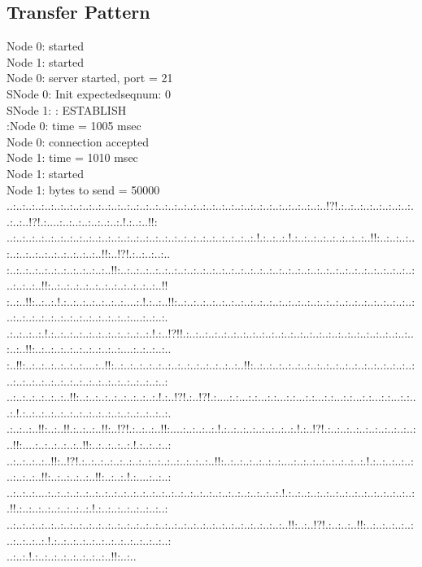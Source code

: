 \documentclass[paper=a4, fontsize=11pt]{scrartcl} %
\numberwithin{equation}{section} %
\numberwithin{figure}{section} %
\numberwithin{table}{section} %
\begin{document}
\subsection{Transfer Pattern}
Node 0: started\\
Node 1: started\\
Node 0: server started, port = 21\\
SNode 0: Init expectedseqnum: 0\\
SNode 1: : ESTABLISH\\
:Node 0: time = 1005 msec\\
Node 0: connection accepted\\
Node 1: time = 1010 msec\\
Node 1: started\\
Node 1: bytes to send = 50000\\
..:..:..:..:..:..:..:..:..:..:..:..:..:..:..:..:..:..:..:..:..:..:..:..:..:..:..:..:..:..:..:..:..:..!?!.:..:..:..:..:..:..:..:..:..:..!?!.:....:..:..:..:..:..:..:.!.:..:..!!:\\..:..:..:..:..:..:..:..:..:..:..:..:..:..:..:..:..:..:..:..:..:..:..:..:..:..:.!.:..:..:.!.:..:..:..:..:..:..:..:..!!:..:..:..:..:..:..:..:..:..:..:..:..:..:..!!:..!?!.:..:..:..:..\\:..:..:..:..:..:..:..:..:..:..:..!!:..:..:..:..:..:..:..:..:..:..:..:..:..:..:..:..:..:..:..:..:..:..:..:..:..:..:..:..:..:..:..:..:..:..:..!!:..:..:..:..:..:..:..:..:..:..:..:..!!\\:..:..!!:..:..:.!.:..:..:..:..:..:..:....:.!.:..:..!!:..:..:..:..:..:..:..:..:..:..:..:..:..:..:..:..:..:..:..:..:..:..:..:..:..:..:..:..:..:..:..:..:..:..:..:..:..:..:....:..:..:.\\.:..:..:..:.!.:..:..:..:..:..:..:..:..:..:..:.!.:..!?!!.:..:..:..:..:..:..:..:..:..:..:..:..:..:..:..:..:..:..:..:..:..:..:..:..:..:..!!:..:..:..:..:..:..:..:..:..:....:..:..:..:..\\:..!!:..:..:..:..:..:..:....:..!!:..:..:..:..:..:..:..:..:..:..:..:..:..:..!!:..:..:..:..:..:..:..:..:..:..:..:..:..:..:..:..:..:..:..:..:..:..:..:..:..:..:..:..:..:..:..:..:..:..:\\..:..:..:..:..:..:..!!:..:..:..:..:..:..:..:..:.!.:..!?!.:..!?!.:....:.:...:.:...:.:...:.:...:.:...:.:...:.:...:.:...:.:...:.:...:.!.:..:..:..:..:..:..:..:..:..:..:..:..:..:..:..:.\\.:..:..:..!!:..:..!!.:..:..:..!!:..!?!.:..:..:..!!:....:..:..:..:.!.:..:..:..:..:..:..:..:.!.:..!?!.:..:..:..:..:..:..:..:..:..:..!!:....:..:..:..:..:..!!:..:..:..:..:.!.:..:..:..:\\..:..:..:..:..!!:..!?!.:..:..:..:..:..:..:..:..:..:..:..:..:..:..!!:..:..:..:..:..:..:....:..:..:..:..:..:..:..:.!.:..:..:..:..:..:..:..:..!!:..:..:..:..:..!!:..:..:.!.:....:..:..:\\..:..:..:....:..:..:..:..:..:..:..:..:..:..:..:..:..:..:..:..:..:..:..:..:..:..:..:..:.!.:..:..:..:..:..:..:..:..:..:..:..:..:..:.!!.:..:..:..:..:..:..:..:.!.:..:..:..:..:..:..:..:\\..:..:..:..:..:..:..:..:..:..:..:..:..:..:..:..:..:..:..:..:..:..:..:..:..:..:..:..:..:..!!:..:..!?!.:..:..:..!!:..:..:..:..:..:..:..:..:..:.!.:..:..:..:..:..:..:..:..:..:..:..:..:\\..:..:.!.:..:..:..:..:..:..:..:..!!:..:..
\end{document}
